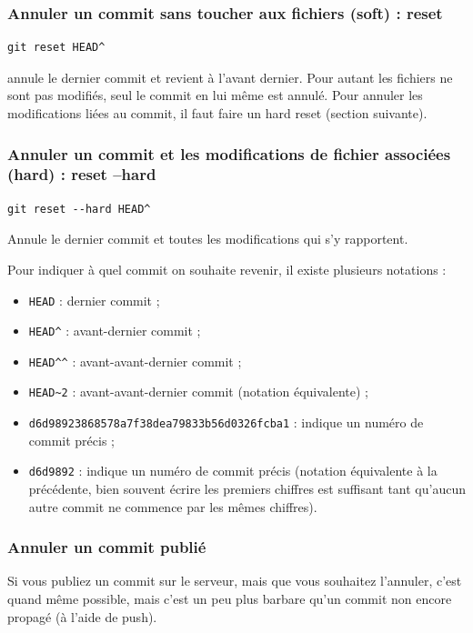 \documentclass[a4paper,twoside]{article}
\begin{document}
\subsubsection{Annuler un commit sans toucher aux fichiers (soft) : reset}
\begin{verbatim}
git reset HEAD^
\end{verbatim}
annule le dernier commit et revient à l'avant dernier. Pour autant les fichiers ne sont pas modifiés, seul le commit en lui même est annulé. Pour annuler les modifications liées au commit, il faut faire un hard reset (section suivante).


\subsubsection{Annuler un commit et les modifications de fichier associées (hard) : reset --hard}
\begin{verbatim}
git reset --hard HEAD^
\end{verbatim}
Annule le dernier commit et toutes les modifications qui s'y rapportent. 

Pour indiquer à quel commit on souhaite revenir, il existe plusieurs notations :
\begin{itemize}
\item \verb|HEAD| : dernier commit ;
\item \verb|HEAD^| : avant-dernier commit ;
\item \verb|HEAD^^| : avant-avant-dernier commit ;
\item \verb|HEAD~2| : avant-avant-dernier commit (notation équivalente) ;
\item \verb|d6d98923868578a7f38dea79833b56d0326fcba1| : indique un numéro de commit précis ;
\item \verb|d6d9892| : indique un numéro de commit précis (notation équivalente à la précédente, bien souvent écrire les premiers chiffres est suffisant tant qu'aucun autre commit ne commence par les mêmes chiffres).
\end{itemize}

\subsubsection{Annuler un commit publié}
Si vous publiez un commit sur le serveur, mais que vous souhaitez l'annuler, c'est quand même possible, mais c'est un peu plus barbare qu'un commit non encore propagé (à l'aide de push). 
\end{document}
